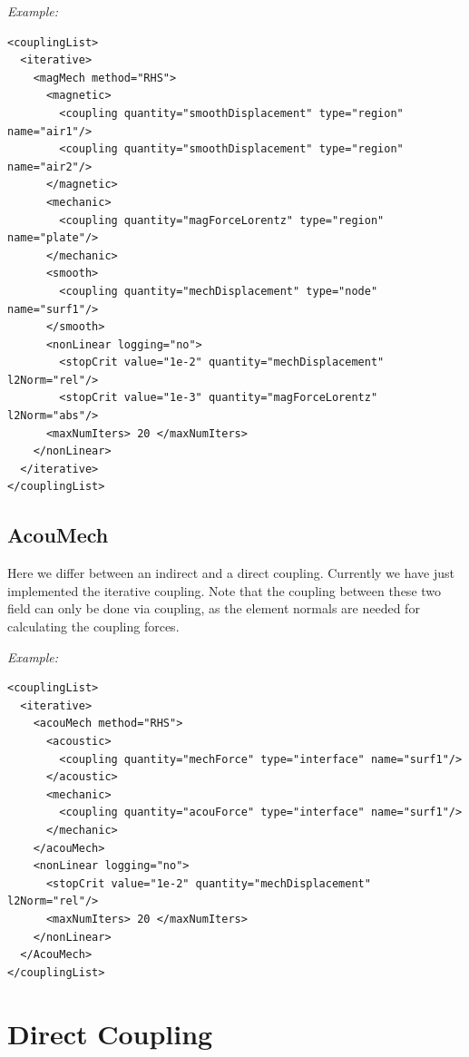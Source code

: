 \bigskip
\noindent
{\it Example:}

\begin{verbatim}
<couplingList>
  <iterative>
    <magMech method="RHS">
      <magnetic>
        <coupling quantity="smoothDisplacement" type="region" name="air1"/>
        <coupling quantity="smoothDisplacement" type="region" name="air2"/>
      </magnetic>
      <mechanic>
        <coupling quantity="magForceLorentz" type="region" name="plate"/>
      </mechanic>
      <smooth>
        <coupling quantity="mechDisplacement" type="node" name="surf1"/>
      </smooth>
      <nonLinear logging="no">
        <stopCrit value="1e-2" quantity="mechDisplacement" l2Norm="rel"/>
        <stopCrit value="1e-3" quantity="magForceLorentz" l2Norm="abs"/>
      <maxNumIters> 20 </maxNumIters>
    </nonLinear>
  </iterative>
</couplingList>
\end{verbatim}


\subsection{AcouMech}
Here we differ between an indirect and a direct coupling. Currently we have
just implemented the iterative coupling. Note that the coupling
between these two field can only be done via  coupling,
as the element normals are needed for calculating the coupling forces.

\bigskip
\noindent
{\it Example:}

\begin{verbatim}
<couplingList>
  <iterative>
    <acouMech method="RHS">
      <acoustic>
        <coupling quantity="mechForce" type="interface" name="surf1"/>
      </acoustic>
      <mechanic>
        <coupling quantity="acouForce" type="interface" name="surf1"/>
      </mechanic>
    </acouMech>
    <nonLinear logging="no">
      <stopCrit value="1e-2" quantity="mechDisplacement" l2Norm="rel"/>
      <maxNumIters> 20 </maxNumIters>
    </nonLinear>
  </AcouMech>
</couplingList>
\end{verbatim}
%
%
\section{Direct Coupling}
%
%
